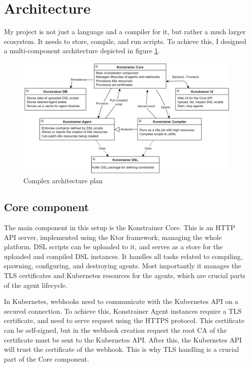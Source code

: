 \clearpage\section{Architecture}

My project is not just a language and a compiler for it, but rather a much larger ecosystem. It needs to store, compile, and run scripts. To achieve this, I designed a multi-component architecture depicted in figure \ref{fig:comp_arch}.

\begin{figure}[h]
    \centering
    \includegraphics[width=130mm, keepaspectratio]{content/75_implementation/xarch.png}
    \caption{Complex architecture plan}
    \label{fig:comp_arch}
\end{figure}

\subsection{Core component}

The main component in this setup is the Konstrainer Core. This is an HTTP API server, implemented using the Ktor framework, managing the whole platform. DSL scripts can be uploaded to it, and serves as a store for the uploaded and compiled DSL instances. It handles all tasks related to compiling, spawning, configuring, and destroying agents. Most importantly it manages the TLS certificates and Kubernetes resources for the agents, which are crucial parts of the agent lifecycle.

In Kubernetes, webhooks need to communicate with the Kubernetes API on a secured connection. To achieve this, Konstrainer Agent instances require a TLS certificate, and need to serve request using the HTTPS protocol. This certificate can be self-signed, but in the webhook creation request the root CA of the certificate must be sent to the Kubernetes API. After this, the Kubernetes API will trust the certificate of the webhook. This is why TLS handling is a crucial part of the Core component.

